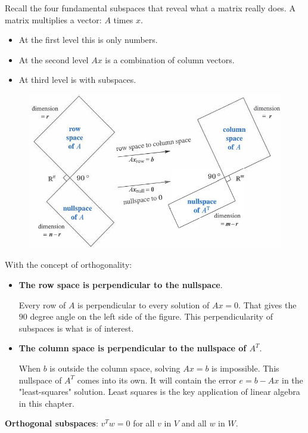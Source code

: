 \documentclass[10pt,a4paper]{article}
\begin{document}
Recall the four fundamental subspaces that reveal what a matrix really does. A matrix multiplies a
vector:  $A$ times $x$.  
\begin{itemize}
    \item At the first level this is only numbers.
    \item At the second level $Ax$ is a combination of column vectors.
    \item At third level is with subspaces. 
\end{itemize}   
\begin{figure} [h!]
    \centering
    \includegraphics[scale=0.7]{sub.JPG}
\end{figure}

With the concept of orthogonality:
\begin{itemize}
    \item \textbf{The row space is perpendicular to the nullspace}.  
    
    Every row of $A$ is perpendicular to every solution of $Ax = 0$. That gives the $90$ degree
    angle on the left side of the figure. This perpendicularity of subspaces is what is of interest.

    \item \textbf{The column space is perpendicular to the nullspace of $A^T$}.
    
    When $b$ is outside the column space, solving $Ax = b$ is impossible. This nullspace of 
    $A^T$ comes into its own. It will contain the error $e  =  b - Ax$ in the "least-squares" solution. 
    Least squares is the key application of linear algebra in this chapter. 
\end{itemize}

\begin{tcolorbox}[breakable,colback=white]
    \textbf{Orthogonal subspaces}: $v^T w = 0$ for all $v$ in $V$ and all $w$ in $W$.
\end{tcolorbox}
\end{document}
